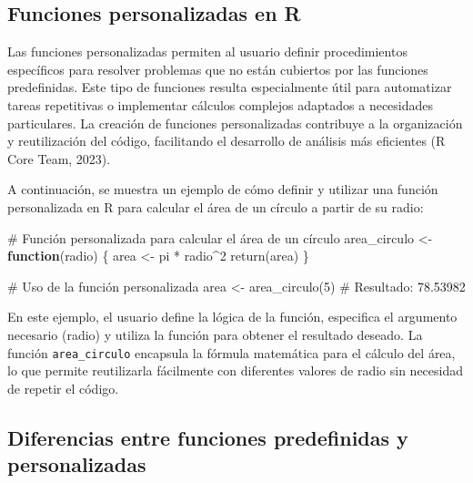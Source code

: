 \documentclass[
  spanish,
  a4paper,
  DIV=11,
  numbers=noendperiod,
  onepage,
  openany]{scrreprt}
\newenvironment{Shaded}{\begin{snugshade}}{\end{snugshade}}
\newcommand{\CommentTok}[1]{\textcolor[rgb]{0.37,0.37,0.37}{#1}}
\newcommand{\ControlFlowTok}[1]{\textcolor[rgb]{0.00,0.23,0.31}{\textbf{#1}}}
\newcommand{\DecValTok}[1]{\textcolor[rgb]{0.68,0.00,0.00}{#1}}
\newcommand{\FunctionTok}[1]{\textcolor[rgb]{0.28,0.35,0.67}{#1}}
\newcommand{\NormalTok}[1]{\textcolor[rgb]{0.00,0.23,0.31}{#1}}
\newcommand{\OtherTok}[1]{\textcolor[rgb]{0.00,0.23,0.31}{#1}}
\newcommand{\SpecialCharTok}[1]{\textcolor[rgb]{0.37,0.37,0.37}{#1}}
\begin{document}
\subsection{Funciones personalizadas en
R}\label{funciones-personalizadas-en-r}

Las funciones personalizadas permiten al usuario definir procedimientos
específicos para resolver problemas que no están cubiertos por las
funciones predefinidas. Este tipo de funciones resulta especialmente
útil para automatizar tareas repetitivas o implementar cálculos
complejos adaptados a necesidades particulares. La creación de funciones
personalizadas contribuye a la organización y reutilización del código,
facilitando el desarrollo de análisis más eficientes (R Core Team,
2023).

A continuación, se muestra un ejemplo de cómo definir y utilizar una
función personalizada en R para calcular el área de un círculo a partir
de su radio:

\begin{Shaded}
\begin{Highlighting}[]
\CommentTok{\# Función personalizada para calcular el área de un círculo}
\NormalTok{area\_circulo }\OtherTok{\textless{}{-}} \ControlFlowTok{function}\NormalTok{(radio) \{}
\NormalTok{  area }\OtherTok{\textless{}{-}}\NormalTok{ pi }\SpecialCharTok{*}\NormalTok{ radio}\SpecialCharTok{\^{}}\DecValTok{2}
  \FunctionTok{return}\NormalTok{(area)}
\NormalTok{\}}

\CommentTok{\# Uso de la función personalizada}
\NormalTok{area }\OtherTok{\textless{}{-}} \FunctionTok{area\_circulo}\NormalTok{(}\DecValTok{5}\NormalTok{)   }\CommentTok{\# Resultado: 78.53982}
\end{Highlighting}
\end{Shaded}

En este ejemplo, el usuario define la lógica de la función, especifica
el argumento necesario (radio) y utiliza la función para obtener el
resultado deseado. La función \texttt{area\_circulo} encapsula la
fórmula matemática para el cálculo del área, lo que permite reutilizarla
fácilmente con diferentes valores de radio sin necesidad de repetir el
código.

\subsection{Diferencias entre funciones predefinidas y
personalizadas}\label{diferencias-entre-funciones-predefinidas-y-personalizadas}
\end{document}

